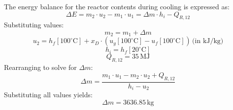 The energy balance for the reactor contents during cooling is expressed as:  
\[
\Delta E = m_2 \cdot u_2 - m_1 \cdot u_1 = \Delta m \cdot h_i - Q_{R,12}
\]  
Substituting values:  
\[
m_2 = m_1 + \Delta m
\]  
\[
u_2 = h_f[100^\circ\text{C}] + x_D \cdot (u_g[100^\circ\text{C}] - u_f[100^\circ\text{C}]) \, \text{(in kJ/kg)}
\]  
\[
h_i = h_f[20^\circ\text{C}]
\]  
\[
Q_{R,12} = 35 \, \text{MJ}
\]  
Rearranging to solve for \( \Delta m \):  
\[
\Delta m = \frac{m_1 \cdot u_1 - m_2 \cdot u_2 + Q_{R,12}}{h_i - u_2}
\]  
Substituting all values yields:  
\[
\Delta m = 3636.85 \, \text{kg}
\]